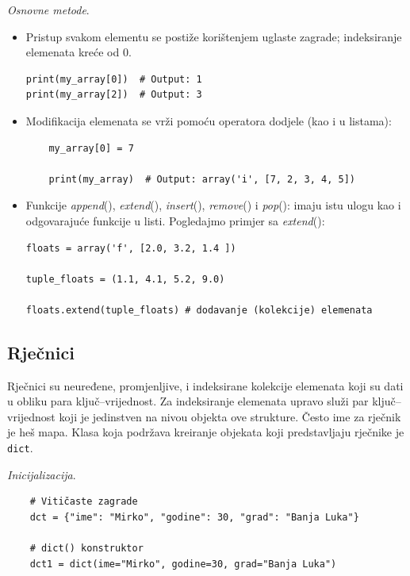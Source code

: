 \textit{Osnovne metode}. 
\begin{itemize}
	\item Pristup svakom elementu se postiže korištenjem uglaste zagrade; indeksiranje elemenata kreće od 0. 
	\begin{verbatim}
print(my_array[0])  # Output: 1
print(my_array[2])  # Output: 3
	\end{verbatim}

\item Modifikacija elemenata se vrži pomoću operatora dodjele (kao i u listama):
\begin{verbatim}
	my_array[0] = 7
	
	print(my_array)  # Output: array('i', [7, 2, 3, 4, 5])
\end{verbatim}
\item Funkcije \textit{append}(), \textit{extend}(),  \textit{insert}(), \textit{remove}() i \textit{pop}():  imaju istu ulogu kao i odgovarajuće funkcije u listi. Pogledajmo primjer sa \textit{extend}(): 
\begin{verbatim}
floats = array('f', [2.0, 3.2, 1.4 ])

tuple_floats = (1.1, 4.1, 5.2, 9.0)

floats.extend(tuple_floats) # dodavanje (kolekcije) elemenata
\end{verbatim} 
  
\end{itemize}


\subsection{Rječnici}
Rječnici su neuređene, promjenljive, i indeksirane kolekcije elemenata koji su dati u obliku para ključ--vrijednost. Za indeksiranje elemenata upravo služi par ključ--vrijednost koji je jedinstven na nivou objekta ove strukture. Često ime za rječnik je heš mapa. Klasa koja podržava kreiranje objekata koji predstavljaju rječnike je \texttt{dict}. 

\textit{Inicijalizacija}.  

\begin{verbatim}
	# Vitičaste zagrade
	dct = {"ime": "Mirko", "godine": 30, "grad": "Banja Luka"}
	
	# dict() konstruktor
	dct1 = dict(ime="Mirko", godine=30, grad="Banja Luka")
\end{verbatim}


